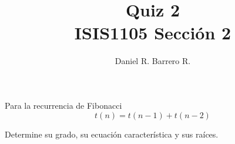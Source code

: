 \documentclass{amsart}
\title{Quiz 2 \\ ISIS1105 Sección 2}
\author{Daniel R. Barrero R.}
\begin{document}
\maketitle

\section{} Para la recurrencia de Fibonacci
\[
	t(n)= t(n-1) + t(n-2)
\]

Determine su grado, su ecuación característica y sus raíces.
\end{document}
